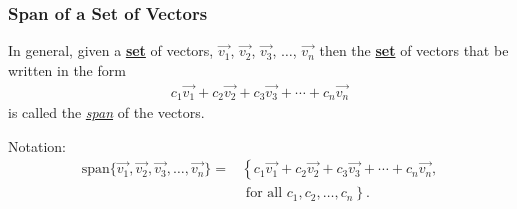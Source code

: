 \begin{frame}
  \frametitle{Span of a Set of Vectors}

  In general, given a \textbf{\underline{set}} of vectors, $\vec{v_1}$, $\vec{v_2}$, $\vec{v_3}$,
  $\ldots$, $\vec{v_n}$ then the \textbf{\underline{set}} of vectors
  that  be written in the form
  \begin{eqnarray*}
    c_1 \vec{v_1} + c_2 \vec{v_2} + c_3 \vec{v_3} + \cdots + c_n \vec{v_n}
  \end{eqnarray*}
  is called {\color{red}the \textit{\underline{span}} of the vectors.}

  {
    Notation:
    {\color{blue}
     \begin{eqnarray*}
  \mathrm{span}\{\vec{v_1}, \vec{v_2}, \vec{v_3},\ldots, \vec{v_n} \}
  =&\left\{c_1\vec{v_1}+c_2\vec{v_2}+c_3\vec{v_3}+\cdots+c_n\vec{v_n},\right.\\
  &\text{ for all }\left.c_1, c_2, \ldots, c_n\right\}.
    \end{eqnarray*}
    }
  }
  

\end{frame}


